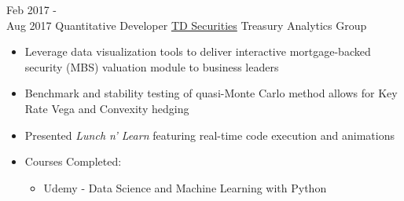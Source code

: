 \documentclass[letterpaper]{twentysecondcv} %
\begin{document}
\begin{twenty}
	\twentyitem
    	{Feb 2017 - \\ Aug 2017}
        {Quantitative Developer}
        {\href{https://www.tdsecurities.com}{TD Securities}}
        {Treasury Analytics Group}
        {%
	        \item{}
    	    \item{}
    	    \item{}
    	    \item
        	\item{}
        	\item
        	\item{}
        }
        {
     \begin{itemize}
		\item Leverage data visualization tools to deliver interactive mortgage-backed security (MBS) valuation module to business leaders
        \item Benchmark and stability testing of quasi-Monte Carlo method allows for Key Rate Vega and Convexity hedging   
        \item Presented \emph{Lunch n' Learn} featuring real-time code execution and animations
        \item Courses Completed: 
        \begin{itemize}
        	\item Udemy - Data Science and Machine Learning with Python
        \end{itemize}
    \end{itemize}}
        
\end{twenty}
\vfill
\end{document}

